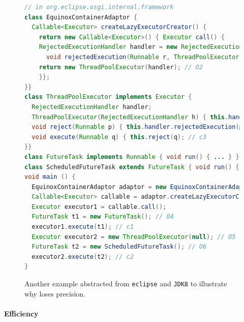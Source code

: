 \begin{figure}[h]
\begin{center}
\begin{mdframed}[
align=center,
usetwoside=false,
 rightmargin=0.5cm,
innerleftmargin=1.0ex,
innertopmargin=0.2ex,
innerbottommargin=0.2ex
]
\begin{lstlisting}[language=java, otherkeywords = {null}]
// in org.eclipse.osgi.internal.framework
class EquinoxContainerAdaptor {
  Callable<Executor> createLazyExecutorCreator() {
	return new Callable<Executor>() { Executor call() {
    RejectedExecutionHandler handler = new RejectedExecutionHandler() { // O1
      void rejectedExecution(Runnable r, ThreadPoolExecutor exe) { r.run(); }};
    return new ThreadPoolExecutor(handler); // O2
    }};
}}
class ThreadPoolExecutor implements Executor {
  RejectedExecutionHandler handler;
  ThreadPoolExecutor(RejectedExecutionHandler h) { this.handler = h; }
  void reject(Runnable p) { this.handler.rejectedExecution(p, this); } // c4
  void execute(Runnable q) { this.reject(q); // c3 
}}
class FutureTask implements Runnable { void run() { ... } }
class ScheduledFutureTask extends FutureTask { void run() { ... } }
void main () {
  EquinoxContainerAdaptor adaptor = new EquinoxContainerAdaptor(); // O3
  Callable<Executor> callable = adaptor.createLazyExecutorCreator();
  Executor executor1 = callable.call();
  FutureTask t1 = new FutureTask(); // O4
  executor1.execute(t1); // c1
  Executor executor2 = new ThreadPoolExecutor(null); // O5
  FutureTask t2 = new ScheduledFutureTask(); // O6
  executor2.execute(t2); // c2
}
\end{lstlisting}
\end{mdframed}
\end{center}
\caption{Another example abstracted from \texttt{eclipse} and \texttt{JDK8} to illustrate why \selectx loses precision.
\label{fig:eclipsePrecisionLoss}}
\end{figure}

\paragraph*{Efficiency}
\label{subsec:efficiency}

